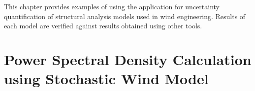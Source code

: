 This chapter provides examples of using the \texttt{\getsoftwarename{}} application for uncertainty
quantification of structural analysis models used in wind
engineering. Results of each model are verified against results
obtained using other tools.\\

\section{Power Spectral Density Calculation using  Stochastic Wind Model}


